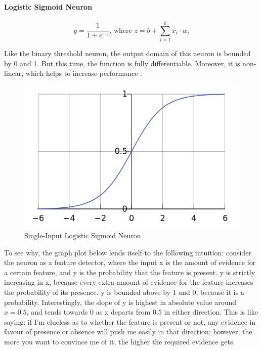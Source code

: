 \documentclass[a4paper,11pt]{article}
\begin{document}
\paragraph{Logistic Sigmoid Neuron} 
\begin{equation}
\label{sigmoid neuron}
y = \frac{1}{1 + e^{-z}} \text{, where } z = b + \sum\limits_{i=1}^k x_{i}\cdot w_{i}
\end{equation}

Like the binary threshold neuron, the output domain of this neuron is bounded by 0 and 1. But this time, the function is fully differentiable. Moreover, it is non-linear, which helps to increase performance \cite{DL-book}.

\begin{figure}[h!]
	\centering
	\includegraphics[scale=0.3]{images/sigmoid.png}
	\caption{Single-Input Logistic Sigmoid Neuron}
\end{figure}
 
To see why, the graph plot below lends itself to the following intuition: consider the neuron as a feature detector, where the input x is the amount of evidence for a certain feature, and y is the probability that the feature is present. y is strictly increasing in x, because every extra amount of evidence for the feature increases the probability of its presence. y is bounded above by 1 and 0, because it is a probability. Interestingly, the slope of y is highest in absolute value around $x=0.5$, and tends towards 0 as x departs from 0.5 in either direction. This is like saying: if I'm clueless as to whether the feature is present or not, any evidence in favour of presence or absence will push me easily in that direction; however, the more you want to convince me of it, the higher the required evidence gets.
\end{document}
